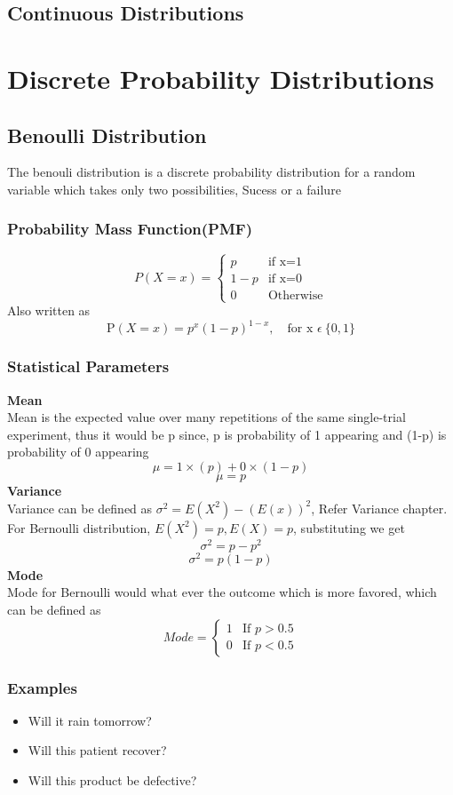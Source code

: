 \documentclass[12pt]{extarticle}
\begin{document}
\subsection{Continuous Distributions}

\section{Discrete Probability Distributions}
\subsection{Benoulli Distribution}
The benouli distribution is a discrete probability distribution for a random variable which takes only two possibilities, Sucess or a failure 
\subsubsection{Probability Mass Function(PMF)}
$$
P(X=x) = 
\begin{cases}
    p & \text{if x=1} \\
    1-p & \text{if x=0} \\
    0 & \text{Otherwise}
\end{cases}
$$
Also written as 
$$ \mathrm{P}(X=x) = p^x(1-p)^{1-x}, \quad \text{for x }\epsilon \ \{0,1\}$$

\subsubsection{Statistical Parameters}
\textbf{Mean}\\
Mean is the expected value over many repetitions of the same single-trial experiment,
thus it would be p since, p is probability of 1 appearing and (1-p) is probability of 0 appearing
$$\mu = 1 \times (p)+0 \times (1-p)$$
$$\mu = p$$
\textbf{Variance}\\
Variance can be defined as \( \sigma^2 = E(X^2) - (E(x))^2\), Refer Variance chapter. 
For Bernoulli distribution, \(E(X^2) = p, E(X) = p\), substituting we get
$$\sigma^2 = p - p^2$$
$$\sigma^2 = p(1-p)$$
\textbf{Mode}\\
Mode for Bernoulli would what ever the outcome which is more favored, which can be defined as  
$$
Mode = 
\begin{cases}
    1 & \text{If \(p > 0.5 \)}  \\
    0 & \text{If \(p < 0.5\)}
\end{cases}
$$
\subsubsection{Examples}
\begin{itemize}
    \item Will it rain tomorrow?
    \item Will this patient recover?
    \item Will this product be defective?
\end{itemize}
\end{document}
